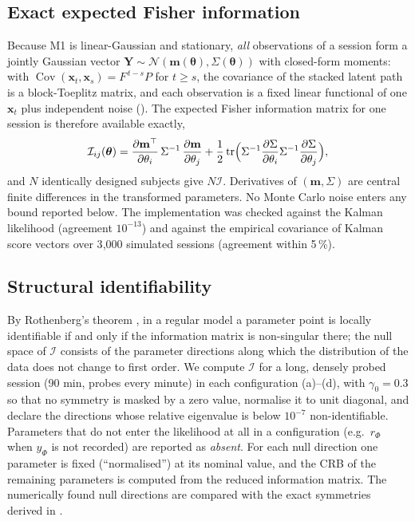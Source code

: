 \documentclass[12pt,a4paper]{article}
\theoremstyle{plain}
\theoremstyle{definition}
\theoremstyle{remark}
\newcommand{\rPhi}{r_{\Phi}}
\newcommand{\Cov}{\operatorname{Cov}}
\newcommand{\thetav}{\boldsymbol{\theta}}
\newcommand{\xv}{\mathbf{x}}
\begin{document}
\subsection{Exact expected Fisher information}
\label{sec:fisher}

Because M1 is linear-Gaussian and stationary, \emph{all} observations of a session form a jointly Gaussian vector $\mathbf Y\sim\mathcal N(\mathbf m(\thetav),\Sigma(\thetav))$ with closed-form moments: with $\Cov(\xv_t,\xv_s)=F^{\,t-s}P$ for $t\ge s$, the covariance of the stacked latent path is a block-Toeplitz matrix, and each observation is a fixed linear functional of one $\xv_t$ plus independent noise (). The expected Fisher information matrix for one session is therefore available exactly,
\begin{equation}
  \mathcal I_{ij}(\thetav)=\pdv{\mathbf m^\top}{\theta_i}\,\Sigma^{-1}\,\pdv{\mathbf m}{\theta_j}
  +\frac12\operatorname{tr}\Bigl(\Sigma^{-1}\pdv{\Sigma}{\theta_i}\Sigma^{-1}\pdv{\Sigma}{\theta_j}\Bigr),
  \label{eq:fisher}
\end{equation}
and $N$ identically designed subjects give $N\mathcal I$. Derivatives of $(\mathbf m,\Sigma)$ are central finite differences in the transformed parameters. No Monte Carlo noise enters any bound reported below. The implementation was checked against the Kalman likelihood (agreement $10^{-13}$) and against the empirical covariance of Kalman score vectors over 3{,}000 simulated sessions (agreement within 5\,\%).

\subsection{Structural identifiability}
\label{sec:structural}

By Rothenberg's theorem \citep{Rothenberg1971}, in a regular model a parameter point is locally identifiable if and only if the information matrix is non-singular there; the null space of $\mathcal I$ consists of the parameter directions along which the distribution of the data does not change to first order. We compute $\mathcal I$ for a long, densely probed session (90 min, probes every minute) in each configuration (a)--(d), with $\gamma_0=0.3$ so that no symmetry is masked by a zero value, normalise it to unit diagonal, and declare the directions whose relative eigenvalue is below $10^{-7}$ non-identifiable. Parameters that do not enter the likelihood at all in a configuration (e.g.\ $\rPhi$ when $y_\Phi$ is not recorded) are reported as \emph{absent}. For each null direction one parameter is fixed (``normalised'') at its nominal value, and the CRB of the remaining parameters is computed from the reduced information matrix. The numerically found null directions are compared with the exact symmetries derived in .
\end{document}
